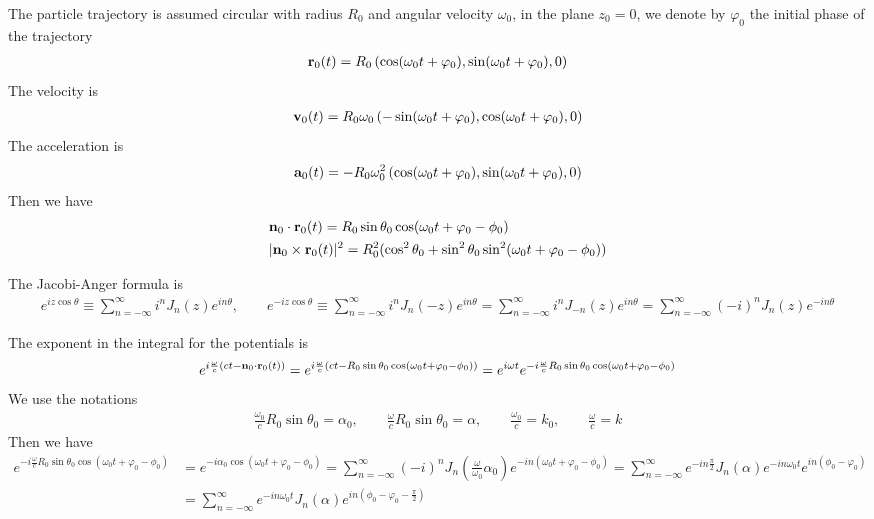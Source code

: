 The particle trajectory is assumed circular with radius $R_0$ and angular velocity $\omega_0$, in the plane $z_0=0$, we denote by $\varphi_0$ the initial phase of the trajectory
\begin{align}
    {\bf r}_0(t)=R_0\left(\cos(\omega_0 t+\varphi_0), \sin(\omega_0 t+\varphi_0), 0\right)
\end{align}
The velocity is
\begin{align}
    {\bf v}_0(t)=R_0\omega_0\left(-\sin(\omega_0 t+\varphi_0), \cos(\omega_0 t+\varphi_0), 0\right)
\end{align}
The acceleration is
\begin{align}
    {\bf a}_0(t)=-R_0\omega_0^2\left(\cos(\omega_0 t+\varphi_0), \sin(\omega_0 t+\varphi_0), 0\right)
\end{align}
Then we have
\begin{align}
     & {\bf n}_0\cdot{\bf r}_0(t)=R_0\sin\theta_0\cos(\omega_0 t+\varphi_0-\phi_0)                             \\
     & |{\bf n}_0\times{\bf r}_0(t)|^2=R_0^2(\cos^2\theta_0+\sin^2\theta_0\sin^2(\omega_0 t+\varphi_0-\phi_0))
\end{align}

The Jacobi-Anger formula is
\begin{align}
    e^{i z \cos \theta} \equiv \sum_{n=-\infty}^{\infty} i^n J_n(z) e^{i n \theta}, \qquad e^{-i z \cos \theta} \equiv \sum_{n=-\infty}^{\infty} i^n J_n(-z) e^{i n \theta} = \sum_{n=-\infty}^{\infty} i^n J_{-n}(z) e^{i n \theta}=\sum_{n=-\infty}^{\infty} (-i)^n J_{n}(z) e^{-i n \theta}
\end{align}

The exponent in the integral for the potentials is
\begin{align}
    e^{i\frac{\omega}c\left(ct-{\bf n}_0\cdot{\bf r}_0(t)\right)}=e^{i\frac{\omega}c\left(ct-R_0\sin\theta_0\cos(\omega_0 t+\varphi_0-\phi_0)\right)}=e^{i\omega t} e^{-i\frac{\omega}c R_0\sin\theta_0\cos(\omega_0 t+\varphi_0-\phi_0)}
\end{align}
We use the notations
\begin{align}
    \frac{\omega_0}c R_0\sin\theta_0=\alpha_0, \qquad \frac{\omega}c R_0\sin\theta_0=\alpha,\qquad \frac{\omega_0}c = k_0,\qquad \frac{\omega}c = k
\end{align}
Then we have
\begin{align}
    e^{-i\frac{\omega}c R_0\sin\theta_0\cos(\omega_0 t+\varphi_0-\phi_0)} & =e^{-i \alpha_0 \cos(\omega_0 t+\varphi_0-\phi_0)}=\sum\limits_{n=-\infty}^{\infty} (-i)^n J_n(\frac{\omega}{\omega_0}\alpha_0) e^{-i n (\omega_0 t+\varphi_0-\phi_0)}=\sum\limits_{n=-\infty}^{\infty} e^{-in\frac{\pi}2} J_n(\alpha) e^{-i n \omega_0 t}e^{in(\phi_0-\varphi_0)}\nonumber \\
                                                                          & = \sum\limits_{n=-\infty}^{\infty} e^{-i n \omega_0 t}J_n(\alpha) e^{in(\phi_0-\varphi_0-\frac{\pi}2)}\label{expser}
\end{align}



